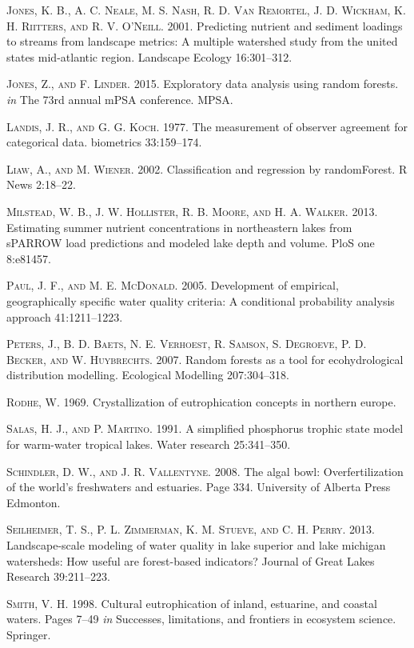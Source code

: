 \documentclass[11pt,]{article}
\begin{document}
\textsc{Jones, K. B., A. C. Neale, M. S. Nash, R. D. Van Remortel, J. D.
Wickham, K. H. Riitters, and R. V. O'Neill}. 2001. Predicting nutrient
and sediment loadings to streams from landscape metrics: A multiple
watershed study from the united states mid-atlantic region. Landscape
Ecology 16:301--312.

\textsc{Jones, Z., and F. Linder}. 2015. Exploratory data analysis using
random forests. \emph{in} The 73rd annual mPSA conference. MPSA.

\textsc{Landis, J. R., and G. G. Koch}. 1977. The measurement of
observer agreement for categorical data. biometrics 33:159--174.

\textsc{Liaw, A., and M. Wiener}. 2002. Classification and regression by
randomForest. R News 2:18--22.

\textsc{Milstead, W. B., J. W. Hollister, R. B. Moore, and H. A.
Walker}. 2013. Estimating summer nutrient concentrations in northeastern
lakes from sPARROW load predictions and modeled lake depth and volume.
PloS one 8:e81457.

\textsc{Paul, J. F., and M. E. McDonald}. 2005. Development of
empirical, geographically specific water quality criteria: A conditional
probability analysis approach 41:1211--1223.

\textsc{Peters, J., B. D. Baets, N. E. Verhoest, R. Samson, S. Degroeve,
P. D. Becker, and W. Huybrechts}. 2007. Random forests as a tool for
ecohydrological distribution modelling. Ecological Modelling
207:304--318.

\textsc{Rodhe, W.} 1969. Crystallization of eutrophication concepts in
northern europe.

\textsc{Salas, H. J., and P. Martino}. 1991. A simplified phosphorus
trophic state model for warm-water tropical lakes. Water research
25:341--350.

\textsc{Schindler, D. W., and J. R. Vallentyne}. 2008. The algal bowl:
Overfertilization of the world's freshwaters and estuaries. Page 334.
University of Alberta Press Edmonton.

\textsc{Seilheimer, T. S., P. L. Zimmerman, K. M. Stueve, and C. H.
Perry}. 2013. Landscape-scale modeling of water quality in lake superior
and lake michigan watersheds: How useful are forest-based indicators?
Journal of Great Lakes Research 39:211--223.

\textsc{Smith, V. H.} 1998. Cultural eutrophication of inland,
estuarine, and coastal waters. Pages 7--49 \emph{in} Successes,
limitations, and frontiers in ecosystem science. Springer.
\end{document}
